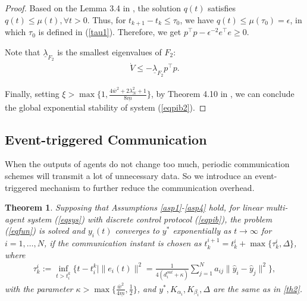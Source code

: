 \documentclass[final,5p,times,twocolumn,authoryear]{elsarticle}
\newtheorem{theorem}{ {Theorem}}
\begin{document}
\begin{proof}
	Based on the  Lemma 3.4 in \citet{nonlinear}, the solution $q(t)$ satisfies $q(t)\le\mu(t), \forall t>0$. Thus, for $t_{k+1}-t_k\le\tau_0$, we have $q(t)\le\mu(\tau_0)=\epsilon$, in which $\tau_0$ is defined in (\ref{tau1}). Therefore, we get $p^\top p-\epsilon^{-2}e^\top e\ge0$.
	
	Note that $\underline \lambda_{F_2}$ is the smallest eigenvalues of $F_2$:
	\begin{align}
		\dot V \le -\underline \lambda_{F_2}p^\top p.
	\end{align}
	
	Finally, setting $\xi>\max\{1,\frac{4\overline w^2+2\lambda_N^2+1}{8\underline m}\}$, by Theorem 4.10 in \citet{nonlinear}, we can conclude the global exponential stability of system (\ref{eqpib2}).
\end{proof}





\subsection{Event-triggered Communication}

When the outputs of agents do not change too much, periodic communication schemes will transmit a lot of unnecessary data. So we introduce an event-triggered mechanism to further reduce the communication overhead.
\begin{theorem}\label{th3}
	Supposing that Assumptions \ref{asp1}-\ref{asp4} hold, for linear multi-agent system (\ref{eqsys}) with discrete control protocol (\ref{eqpib}), the problem (\ref{eqfun}) is solved and $y_i(t)$ converges to $y^*$ exponentially as $t\to\infty$ for $i=1,\dots,N$, if the communication instant is chosen as $t_k^{i+1}=t_k^i+ \max\{\tau_k^i, \Delta\}$, where
	\begin{align}
		\tau_k^i:=\inf_{t>t_i^k}\{t-t_i^k|\|e_i(t)\|^2=\frac{1}{4(d^{out}_i+\kappa)}\sum_{j=1}^{N} a_{ij}\|\hat y_i - \hat y_j \|^2 \},\label{tau2}
	\end{align}
	with the parameter $\kappa>\max\{\frac{\overline{w}^2}{4\underline m}, \frac{1}{2}\}$, and $y^*, K_{\alpha_i}, K_{\beta_i}, \Delta$ are the same as in \autoref{th2}.
\end{theorem}
\end{document}

